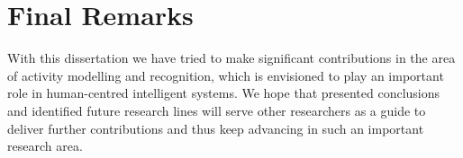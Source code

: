 \section{Final Remarks}
\label{sec:conclusions:final}

With this dissertation we have tried to make significant contributions in the area of activity modelling and recognition, which is envisioned to play an important role in human-centred intelligent systems. We hope that presented conclusions and identified future research lines will serve other researchers as a guide to deliver further contributions and thus keep advancing in such an important research area.